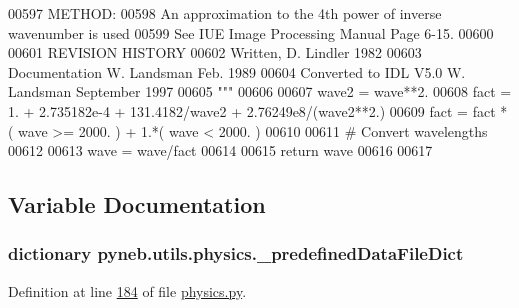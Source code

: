 \begin{DoxyCode}
00597 \textcolor{stringliteral}{METHOD:}
00598 \textcolor{stringliteral}{An approximation to the 4th power of inverse wavenumber is used}
00599 \textcolor{stringliteral}{See IUE Image Processing Manual Page 6-15.}
00600 \textcolor{stringliteral}{}
00601 \textcolor{stringliteral}{REVISION HISTORY}
00602 \textcolor{stringliteral}{Written, D. Lindler 1982}
00603 \textcolor{stringliteral}{Documentation W. Landsman Feb. 1989}
00604 \textcolor{stringliteral}{Converted to IDL V5.0 W. Landsman September 1997}
00605 \textcolor{stringliteral}{    """}
00606 
00607     wave2 = wave**2.
00608     fact = 1. + 2.735182e-4 + 131.4182/wave2 + 2.76249e8/(wave2**2.)
00609     fact = fact * ( wave >= 2000. ) + 1.*( wave < 2000. )
00610     
00611     \textcolor{comment}{# Convert wavelengths}
00612     
00613     wave = wave/fact
00614     
00615     \textcolor{keywordflow}{return} wave
00616 
00617 \end{DoxyCode}


\subsection{Variable Documentation}
\hypertarget{namespacepyneb_1_1utils_1_1physics_a07a026669fde4152bdb02f243cc4f4d4}{}
\subsubsection[{\+\_\+predefined\+Data\+File\+Dict}]{\setlength{\rightskip}{0pt plus 5cm}dictionary pyneb.\+utils.\+physics.\+\_\+predefined\+Data\+File\+Dict}\label{namespacepyneb_1_1utils_1_1physics_a07a026669fde4152bdb02f243cc4f4d4}


Definition at line \hyperlink{physics_8py_source_l00184}{184} of file \hyperlink{physics_8py_source}{physics.\+py}.

\hypertarget{namespacepyneb_1_1utils_1_1physics_a1960e51460ec0d63ffe40b02e0280186}{}
